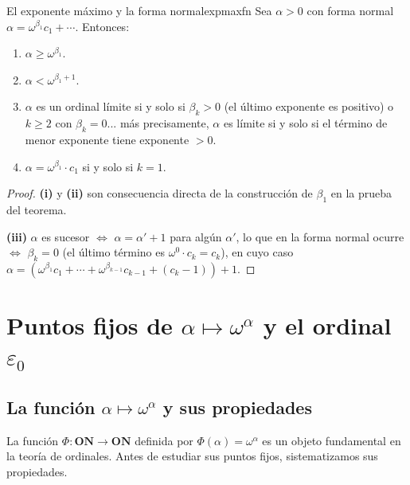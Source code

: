 \begin{proposicion}{El exponente máximo y la forma normal}{expmaxfn}
Sea $\alpha > 0$ con forma normal $\alpha = \omega^{\beta_1} c_1 + \cdots$. Entonces:
\begin{enumerate}[leftmargin=2em, label=(\roman*)]
  \item $\alpha \geq \omega^{\beta_1}$.
  \item $\alpha < \omega^{\beta_1+1}$.
  \item $\alpha$ es un ordinal límite si y solo si $\beta_k > 0$ (el último exponente es positivo) o $k \geq 2$ con $\beta_k = 0$... más precisamente, $\alpha$ es límite si y solo si el término de menor exponente tiene exponente $> 0$.
  \item $\alpha = \omega^{\beta_1} \cdot c_1$ si y solo si $k = 1$.
\end{enumerate}
\end{proposicion}

\begin{proof}
\textbf{(i)} y \textbf{(ii)} son consecuencia directa de la construcción de $\beta_1$ en la prueba del teorema.

\textbf{(iii)} $\alpha$ es sucesor $\iff$ $\alpha = \alpha' + 1$ para algún $\alpha'$, lo que en la forma normal ocurre $\iff$ $\beta_k = 0$ (el último término es $\omega^0 \cdot c_k = c_k$), en cuyo caso $\alpha = (\omega^{\beta_1} c_1 + \cdots + \omega^{\beta_{k-1}} c_{k-1} + (c_k - 1)) + 1$.
\end{proof}

\section{Puntos fijos de \texorpdfstring{$\alpha \mapsto \omega^\alpha$}{alpha -> omega^alpha} y el ordinal \texorpdfstring{$\varepsilon_0$}{ε₀}}

\subsection{La función \texorpdfstring{$\alpha \mapsto \omega^\alpha$}{α ↦ ωᵅ} y sus propiedades}

La función $\Phi: \mathbf{ON} \to \mathbf{ON}$ definida por $\Phi(\alpha) = \omega^\alpha$ es un objeto fundamental en la teoría de ordinales. Antes de estudiar sus puntos fijos, sistematizamos sus propiedades.

